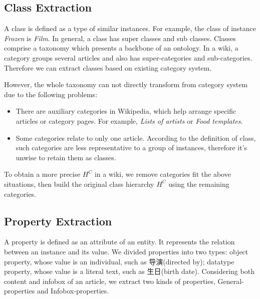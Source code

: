\documentclass[runningheads,a4paper]{llncs}
\begin{document}
\subsection{Class Extraction}
\label{sec:ce}
A class is defined as a type of similar instances. For example, the class of instance \emph{Frozen} is \emph{Film}. In general, a class has super classes and sub classes. Classes comprise a taxonomy which presents a backbone of an ontology. In a wiki, a category groups several articles and also has super-categories and sub-categories. Therefore we can extract classes based on existing category system.

However, the whole taxonomy can not directly transform from category system due to the following problems:
\begin{itemize}
    \item There are auxiliary categories in Wikipedia, which help arrange specific articles or category pages. For example, \emph{Lists of artists} or \emph{Food templates}.
    \item Some categories relate to only one article. According to the definition of class, such categories are less representative to a group of instances, therefore it's unwise to retain them as classes.
\end{itemize}

To obtain a more precise $H^C$ in a wiki, we remove categories fit the above situations, then build the original class hierarchy $H^C$ using the remaining categories.


\subsection{Property Extraction}
\label{sec:pe}
A property is defined as an attribute of an entity. It represents the relation between an instance and its value. We divided properties into two types: object property, whose value is an individual, such as 导演(directed by); datatype property, whose value is a literal text, such as 生日(birth date). Considering both content and infobox of an article, we extract two kinds of properties, General-properties and Infobox-properties.
\end{document}
